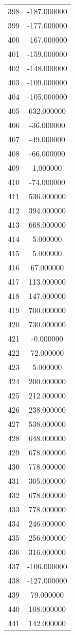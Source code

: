 \documentclass[12pt]{article}
\begin{document}
\begin{longtable}{@{}cc@{}}
398 & -187.000000 \\
399 & -177.000000 \\
400 & -167.000000 \\
401 & -159.000000 \\
402 & -148.000000 \\
403 & -109.000000 \\
404 & -105.000000 \\
405 & 632.000000 \\
406 & -36.000000 \\
407 & -49.000000 \\
408 & -66.000000 \\
409 & 1.000000 \\
410 & -74.000000 \\
411 & 536.000000 \\
412 & 394.000000 \\
413 & 668.000000 \\
414 & 5.000000 \\
415 & 5.000000 \\
416 & 67.000000 \\
417 & 113.000000 \\
418 & 147.000000 \\
419 & 700.000000 \\
420 & 730.000000 \\
421 & -0.000000 \\
422 & 72.000000 \\
423 & 5.000000 \\
424 & 200.000000 \\
425 & 212.000000 \\
426 & 238.000000 \\
427 & 538.000000 \\
428 & 648.000000 \\
429 & 678.000000 \\
430 & 778.000000 \\
431 & 305.000000 \\
432 & 678.000000 \\
433 & 778.000000 \\
434 & 246.000000 \\
435 & 256.000000 \\
436 & 316.000000 \\
437 & -106.000000 \\
438 & -127.000000 \\
439 & 79.000000 \\
440 & 108.000000 \\
441 & 142.000000 \\

\end{longtable}
\end{document}
